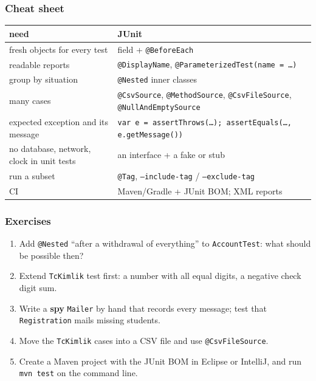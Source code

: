 \documentclass[aspectratio=169,10pt,compress]{beamer}
\begin{document}
\begin{frame}[t,fragile] \frametitle{Cheat sheet}
  \begin{center}\footnotesize
  \begin{tabular}{@{}ll@{}}
    \toprule
    \textbf{need}                              & \textbf{JUnit} \\
    \midrule
    fresh objects for every test               & field + \texttt{@BeforeEach} \\
    readable reports                           & \texttt{@DisplayName}, \texttt{@ParameterizedTest(name = \dots)} \\
    group by situation                         & \texttt{@Nested} inner classes \\
    many cases                                 & \texttt{@CsvSource}, \texttt{@MethodSource}, \texttt{@CsvFileSource}, \texttt{@NullAndEmptySource} \\
    expected exception and its message         & \texttt{var e = assertThrows(\dots); assertEquals(\dots, e.getMessage())} \\
    no database, network, clock in unit tests  & an interface + a fake or stub \\
    run a subset                               & \texttt{@Tag}, \texttt{--include-tag} / \texttt{--exclude-tag} \\
    CI                                         & Maven/Gradle + JUnit BOM; XML reports \\
    \bottomrule
  \end{tabular}
  \end{center}
\end{frame}




\begin{frame}[t,fragile] \frametitle{Exercises}
  \begin{enumerate}\small
    \item Add \texttt{@Nested} ``after a withdrawal of everything'' to \texttt{AccountTest}: what should be possible then?
    \item Extend \texttt{TcKimlik} test first: a number with all equal digits, a negative check digit sum.
    \item Write a \textbf{spy} \texttt{Mailer} by hand that records every message; test that \texttt{Registration} mails missing students.
    \item Move the \texttt{TcKimlik} cases into a CSV file and use \texttt{@CsvFileSource}.
    \item Create a Maven project with the JUnit BOM in Eclipse or IntelliJ, and run \texttt{mvn test} on the command line.
  \end{enumerate}
\end{frame}




\begin{frame}[t,fragile]
	\begin{center}
		\vspace{4cm}
	\end{center}
\end{frame}
\end{document}
